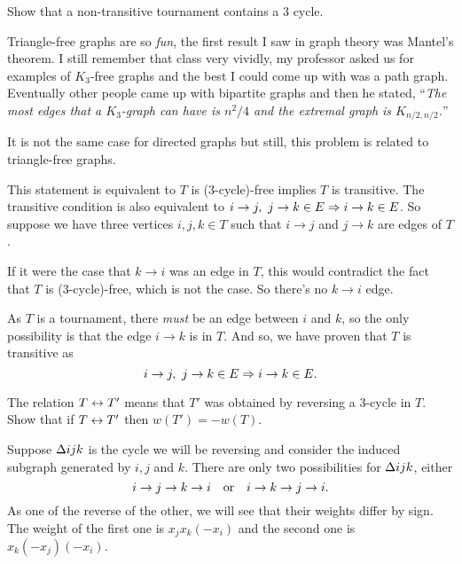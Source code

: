 \documentclass[12pt]{memoir}
\begin{document}
\begin{Ej}
    Show that a non-transitive tournament contains a 3 cycle. 
\end{Ej}

Triangle-free graphs are so \emph{fun}, the first result I saw in graph theory was Mantel's theorem. I still remember that class very vividly, my professor asked us for examples of $K_3$-free graphs and the best I could come up with was a path graph. Eventually other people came up with bipartite graphs and then he stated, ``\emph{The most edges that a $K_3$-graph can have is $n^2/4$ and the extremal graph is $K_{n/2,n/2}$.}''\par 
It is not the same case for directed graphs but still, this problem is related to triangle-free graphs. 
\begin{ptcbr}
    This statement is equivalent to $T$ is (3-cycle)-free implies $T$ is transitive. The transitive condition is also equivalent to $i\to j,\ j\to k\in E\Rightarrow i\to k\in E$. So suppose we have three vertices $i,j,k\in T$ such that $i\to j$ and $j\to k$ are edges of $T$.\par 
    If it were the case that $k\to i$ was an edge in $T$, this would contradict the fact that $T$ is (3-cycle)-free, which is not the case. So there's no $k\to i$ edge.\par 
    As $T$ is a tournament, there \emph{must} be an edge between $i$ and $k$, so the only possibility is that the edge $i\to k$ is in $T$. And so, we have proven that $T$ is transitive as 
    $$i\to j,\ j\to k\in E\Rightarrow i\to k\in E.$$
\end{ptcbr}


\begin{Ej}
The relation $T\leftrightarrow T'$ means that $T'$ was obtained by reversing a 3-cycle in $T$. Show that if $T\leftrightarrow T'$ then $w(T')=-w(T)$. 
\end{Ej}

\begin{ptcbr}
    Suppose $\Delta ijk$ is the cycle we will be reversing and consider the induced subgraph generated by $i,j$ and $k$. There are only two possibilities for $\Delta ijk$, either 
    $$i\to j\to k\to i\quad\text{or}\quad i\to k\to j\to i.$$
    As one of the reverse of the other, we will see that their weights differ by sign. The weight of the first one is $x_jx_k(-x_i)$ and the second one is $x_k(-x_j)(-x_i)$. 
\end{ptcbr}
\end{document}
